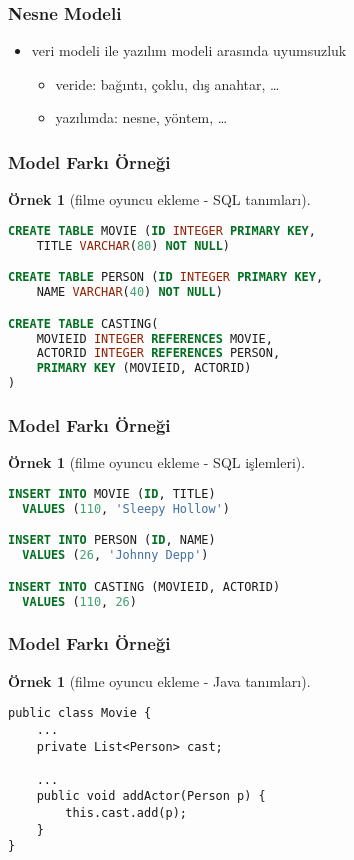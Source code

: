 \documentclass[dvipsnames]{beamer}
\theoremstyle{definition}
\theoremstyle{example}
\newtheorem{ornek}[theorem]{Örnek}
\theoremstyle{plain}
\begin{document}
\begin{frame}
  \frametitle{Nesne Modeli}

  \begin{itemize}
    \item veri modeli ile yazılım modeli arasında uyumsuzluk
    \begin{itemize}
      \item veride: bağıntı, çoklu, dış anahtar, \ldots
      \item yazılımda: nesne, yöntem, \ldots
    \end{itemize}
  \end{itemize}
\end{frame}

\begin{frame}[fragile]
  \frametitle{Model Farkı Örneği}

  \begin{ornek}[filme oyuncu ekleme - SQL tanımları]
    \begin{lstlisting}[language=SQL]
CREATE TABLE MOVIE (ID INTEGER PRIMARY KEY,
    TITLE VARCHAR(80) NOT NULL)

CREATE TABLE PERSON (ID INTEGER PRIMARY KEY,
    NAME VARCHAR(40) NOT NULL)

CREATE TABLE CASTING(
    MOVIEID INTEGER REFERENCES MOVIE,
    ACTORID INTEGER REFERENCES PERSON,
    PRIMARY KEY (MOVIEID, ACTORID)
)
    \end{lstlisting}
  \end{ornek}
\end{frame}

\begin{frame}[fragile]
  \frametitle{Model Farkı Örneği}

  \begin{ornek}[filme oyuncu ekleme - SQL işlemleri]
    \begin{lstlisting}[language=SQL]
INSERT INTO MOVIE (ID, TITLE)
  VALUES (110, 'Sleepy Hollow')

INSERT INTO PERSON (ID, NAME)
  VALUES (26, 'Johnny Depp')

INSERT INTO CASTING (MOVIEID, ACTORID)
  VALUES (110, 26)
    \end{lstlisting}
  \end{ornek}
\end{frame}

\begin{frame}[fragile]
  \frametitle{Model Farkı Örneği}

  \begin{ornek}[filme oyuncu ekleme - Java tanımları]
    \begin{lstlisting}
public class Movie {
    ...
    private List<Person> cast;

    ...
    public void addActor(Person p) {
        this.cast.add(p);
    }
}
    \end{lstlisting}
  \end{ornek}
\end{frame}
\end{document}
